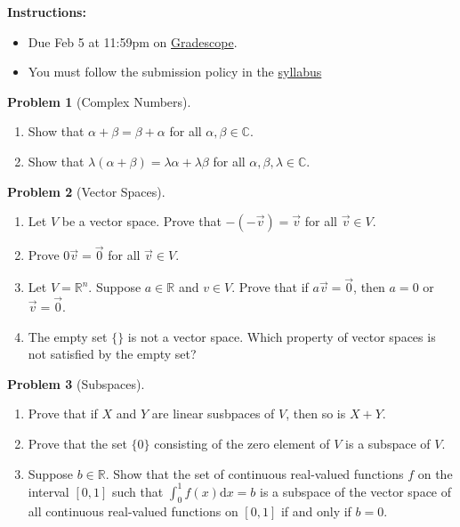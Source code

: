 \documentclass[12pt]{article}
\theoremstyle{definition}
\newtheorem{problem}{Problem}
\renewcommand{\d}{\mathrm{d}}
\begin{document}
\textbf{\Large{}}
    
\vspace{-1.8em}
\hrulefill

\textbf{Instructions:}
    \begin{itemize}
        \item Due Feb 5 at 11:59pm on \href{https://www.gradescope.com/courses/709136}{Gradescope}.
        \item You must follow the submission policy in the \href{https://courses.chen.pw/la_s2024/syllabus.html}{syllabus} 
\end{itemize}
   
\vspace{.5em}

\begin{problem}[Complex Numbers]~
    \begin{enumerate}
        \item  Show that $\alpha +\beta = \beta + \alpha$ for all $\alpha,\beta \in \mathbb{C}$.
        \item Show that $\lambda (\alpha + \beta) = \lambda \alpha + \lambda \beta$ for all $\alpha, \beta,\lambda \in \mathbb{C}$.
    \end{enumerate}
\end{problem}

\begin{problem}[Vector Spaces]~
    \begin{enumerate}
        \item Let $V$ be a vector space. Prove that $-(-\vec{v}) = \vec{v}$ for all $\vec{v}\in V$.
        \item Prove $0\vec{v} = \vec{0}$ for all $\vec{v}\in V$.
        \item Let $V = \mathbb{R}^n$. Suppose $a\in \mathbb{R}$ and $v\in V$. Prove that if $a \vec{v} = \vec{0}$, then $a = 0$ or $\vec{v} = \vec{0}$.
        \item The empty set $\{\}$ is not a vector space. Which property of vector spaces is not satisfied by the empty set?
    \end{enumerate}
\end{problem}

\begin{problem}[Subspaces]~
\begin{enumerate}
    \item Prove that if $X$ and $Y$ are linear susbpaces of $V$, then so is $X+Y$.
\item Prove that the set $\{0\}$ consisting of the zero element of $V$ is a subspace of $V$.
\item Suppose $b\in\mathbb{R}$. 
Show that the set of continuous real-valued functions $f$ on the interval $[0,1]$ such that $\int_0^1 f(x) \d x = b$ is a subspace of the vector space of all continuous real-valued functions on $[0,1]$ if and only if $b=0$.
\end{enumerate}
\end{problem}
\end{document}
